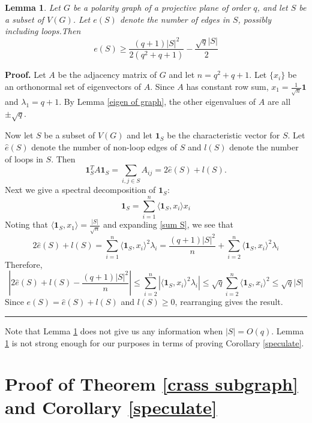\documentclass[12pt]{article}
\newtheorem{lemma}[theorem]{Lemma}
\newenvironment{proof}[1][Proof]{\noindent\textbf{#1.} }
{\hfill \ \rule{0.5em}{0.5em}}
\begin{document}
\begin{lemma}\label{expander mixing lemma for ERq}
    Let $G$ be a polarity graph of a projective plane of order $q$, and let $S$ be a subset of $V(G)$.
    Let $e(S)$ denote the number of edges in $S$, possibly including loops.Then
    $$ e(S)\geq \frac{(q+1)|S|^2}{2(q^2+q+1)} - \frac{\sqrt{q}|S|}{2} $$
\end{lemma}

\begin{proof}
    Let $A$ be the adjacency matrix of $G$ and let $n=q^2+q+1$. Let $\{x_i\}$ be an orthonormal set of eigenvectors of $A$. Since $A$ has constant row sum, $x_1 = \frac{1}{\sqrt{n}} \mathbf{1}$ and $\lambda_1 = q+1$. By Lemma \ref{eigen of graph}, the other eigenvalues of $A$ are all $\pm \sqrt{q}$.


    Now let $S$ be a subset of $V(G)$ and let $\mathbf{1}_S$ be the characteristic vector for $S$. Let $\hat{e}(S)$ denote the number of non-loop edges of $S$ and $l(S)$ denote the number of loops in $S$. Then
    \begin{equation}\label{sum S}
        \mathbf{1}_S^T A \mathbf{1}_S = \sum_{i,j\in S} A_{ij} = 2\hat{e}(S) + l(S).
    \end{equation}
    Next we give a spectral decomposition of $\mathbf{1}_S$:
    $$\mathbf{1}_S = \sum_{i=1}^n \langle \mathbf{1}_S,x_i\rangle x_i $$
    Noting that $\langle \mathbf{1}_S, x_1\rangle = \frac{|S|}{\sqrt{n}}$ and expanding \eqref{sum S}, we see that
    $$ 2\hat{e}(S) + l(S) = \sum_{i=1}^n \langle \mathbf{1}_S, x_i\rangle^2 \lambda_i = \frac{(q+1)|S|^2}{n} + \sum_{i=2}^n \langle \mathbf{1}_S, x_i\rangle^2 \lambda_i $$
    Therefore,
    $$ \left|2 \hat{e}(S) + l(S) - \frac{(q+1)|S|^2}{n} \right| \leq \sum_{i=2}^n \left|\langle \mathbf{1}_S, x_i\rangle^2 \lambda_i \right| \leq \sqrt{q} \sum_{i=2}^n \langle \mathbf{1}_S, x_i\rangle^2 \leq \sqrt{q} |S| $$
    Since $e(S) = \hat{e}(S) + l(S)$ and $l(S)\geq 0$, rearranging gives the result.
\end{proof}



Note that Lemma \ref{expander mixing lemma for ERq} does not give us any information when $|S| = O( q)$.  Lemma \ref{expander mixing lemma for ERq} is not strong enough for our purposes in terms of proving Corollary \ref{speculate}.

\section{Proof of Theorem \ref{crass subgraph} and Corollary \ref{speculate}}\label{section 3}
\end{document}
